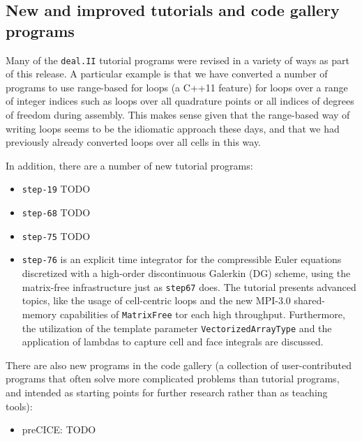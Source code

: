 \documentclass{ansarticle-preprint}
\newcommand{\specialword}[1]{\texttt{#1}}
\newcommand{\dealii}{{\specialword{deal.II}}\xspace}
\begin{document}
\subsection{New and improved tutorials and code gallery programs}
\label{subsec:steps}

Many of the \dealii{} tutorial programs were revised in a variety of
ways as part of this release. A particular example is that we have
converted a number of programs to use range-based for loops (a C++11
feature) for loops over a range of integer indices such as loops over
all quadrature points or all indices of degrees of freedom during
assembly. This makes sense given that the
range-based way of writing loops seems to be the idiomatic approach
these days, and that we had previously already converted loops over
all cells in this way.

In addition, there are a number of new tutorial programs:
\begin{itemize}
\item \texttt{step-19} TODO
\item \texttt{step-68} TODO
\item \texttt{step-75} TODO
\item \texttt{step-76} is an explicit time integrator for the
        compressible Euler equations discretized with a high-order discontinuous
        Galerkin (DG) scheme, using the matrix-free infrastructure just as \texttt{step67} does.
        The tutorial presents advanced topics, like the usage of cell-centric loops and
        the new MPI-3.0 shared-memory capabilities of \texttt{MatrixFree} tor each high
        throughput. Furthermore, the utilization of the template parameter
        \texttt{VectorizedArrayType} and the application of lambdas to capture cell and face
        integrals are discussed.
\end{itemize}

There are also new programs in the code gallery (a collection of
user-contributed programs that often solve more complicated problems
than tutorial programs, and intended as starting points for further
research rather than as teaching tools):
\begin{itemize}
  \item preCICE: TODO
\end{itemize}



\end{document}
